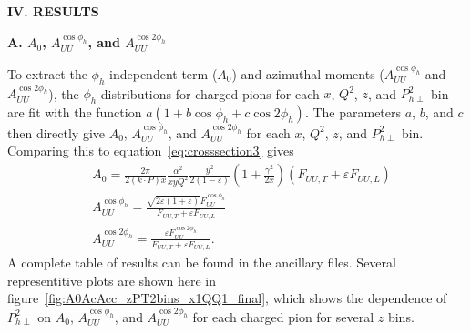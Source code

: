 \documentclass[aps,prl,twocolumn,showpacs,superscriptaddress,groupedaddress]{revtex4-1}  %
\begin{document}

\begin{center}
\textbf{IV. RESULTS} \par
\end{center}
\begin{center}
\textbf{A. $A_0$, $A_{UU}^{\cos\phi_h}$, and $A_{UU}^{\cos 2\phi_h}$} \par
\end{center}
To extract the $\phi_h$-independent term ($A_0$) and azimuthal moments ($A_{UU}^{\cos\phi_h}$ and $A_{UU}^{\cos 2\phi_h}$), the $\phi_h$ distributions for charged pions for each $x$, $Q^2$, $z$, and $P_{h\perp}^2$ bin are fit with the function $a(1 + b\cos\phi_h + c\cos 2\phi_h)$.
The parameters $a$, $b$, and $c$ then directly give $A_0$, $A_{UU}^{\cos\phi_h}$, and $A_{UU}^{\cos 2\phi_h}$ for each $x$, $Q^2$, $z$, and $P_{h\perp}^2$ bin.
Comparing this to equation~\ref{eq:crosssection3} gives
\begin{equation}
\label{eq:A0AcAccDefinitions}
\begin{split}
& A_0 = \frac{2\pi}{2(k\cdot P)x} \frac{\alpha^{2}}{xyQ^{2}} \frac{y^{2}}{2 \left( 1 - \varepsilon \right)} \left( 1 + \frac{\gamma^{2}}{2x} \right) \left( F_{UU,T} + \varepsilon F_{UU,L} \right)
\\
& A_{UU}^{\cos \phi_h} = \frac{\sqrt{2 \varepsilon \left( 1 + \varepsilon \right)} F_{UU}^{\cos \phi_h}}{F_{UU,T} + \varepsilon F_{UU,L}}
\\
& A_{UU}^{\cos 2 \phi_h} = \frac{\varepsilon F_{UU}^{\cos 2 \phi_h}}{F_{UU,T} + \varepsilon F_{UU,L}} .
\end{split}
\end{equation}
A complete table of results can be found in the ancillary files.
Several representitive plots are shown here in figure~\ref{fig:A0AcAcc_zPT2bins_x1QQ1_final}, which shows the dependence of $P_{h\perp}^2$ on $A_0$, $A_{UU}^{\cos\phi_h}$, and $A_{UU}^{\cos 2\phi_h}$ for each charged pion for several $z$ bins.
%
\end{document}
